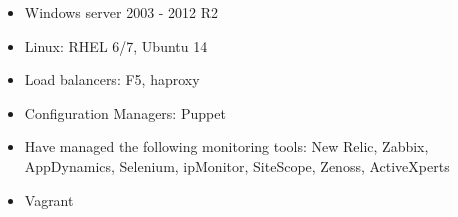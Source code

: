 \begin{itemize}
	\item Windows server 2003 - 2012 R2
	\item Linux: RHEL 6/7, Ubuntu 14
	\item Load balancers: F5, haproxy
	\item Configuration Managers: Puppet
	\item Have managed the following monitoring tools: New Relic, Zabbix, AppDynamics, Selenium, ipMonitor, SiteScope, Zenoss, ActiveXperts
	\item Vagrant
\end{itemize}